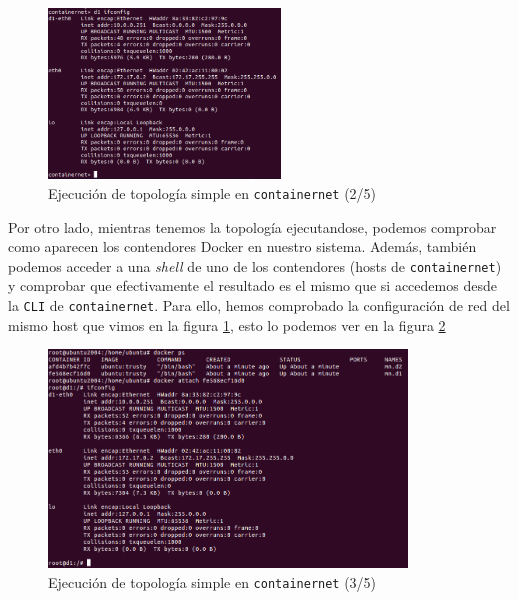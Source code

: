 \documentclass[12pt]{article}
\begin{document}
	\pagebreak

	\begin{figure}[h!]
		\begin{center}
			\includegraphics[width=0.55\textwidth]{img/cn_example2.png}
			\caption{Ejecución de topología simple en \texttt{containernet} (2/5)}
			\label{img: cn simple 2}
		\end{center}
	\end{figure}

	\noindent Por otro lado, mientras tenemos la topología ejecutandose, podemos comprobar como aparecen los contendores Docker en nuestro sistema. Además, también podemos acceder a una \textit{shell} de uno de los contendores (hosts de \texttt{containernet}) y comprobar que efectivamente el resultado es el mismo que si accedemos desde la \texttt{CLI} de \texttt{containernet}. Para ello, hemos comprobado la configuración de red del mismo host que vimos en la figura \ref{img: cn simple 2}, esto lo podemos ver en la figura \ref{img: cn simple 3}

	\begin{figure}[h!]
		\begin{center}
			\includegraphics[width=0.85\textwidth]{img/cn_example3.png}
			\caption{Ejecución de topología simple en \texttt{containernet} (3/5)}
			\label{img: cn simple 3}
		\end{center}
	\end{figure}
\end{document}
